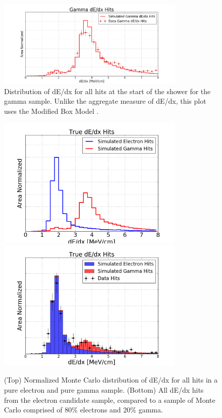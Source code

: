 \begin{figure}[p]
  \centering
  \includegraphics[width=0.8\textwidth]{emshower_figures/photons_landau.png}
  \caption{Distribution of dE/dx for all hits at the start of the shower for the gamma sample.  Unlike the aggregate measure of dE/dx, this plot uses the Modified Box Model \cite{Bruce}.}
  \label{fig:photon_landau}
 \end{figure} 

\begin{figure}[p]
  \centering
   
  \includegraphics[width=0.8\textwidth]{emshower_figures/mcLandaus.png}
  \includegraphics[width=0.8\textwidth]{emshower_figures/fitted_electron_distribution.png}
  \caption{(Top) Normalized Monte Carlo distribution of dE/dx for all hits in a pure electron and pure gamma sample.  (Bottom) All dE/dx hits from the electron candidate sample, compared to a sample of Monte Carlo comprised of 80\% electrons and 20\% gamma.}
  \label{fig:electron_landau}
\end{figure} 




